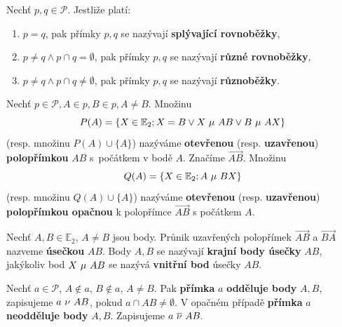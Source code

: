 \begin{definition}
  Nechť $p,q\in \mathscr P$. Jestliže platí:
  \begin{enumerate}[$i.$]
    \item $p=q$, pak přímky $p,q$ se nazývají \textbf{splývající rovnoběžky},
    \item $p \ne q \land p\cap q = \emptyset$, pak přímky $p,q$ se nazývají \textbf{různé rovnoběžky},
    \item $p \ne q \land p\cap q \ne \emptyset$, pak přímky $p,q$ se nazývají \textbf{různoběžky}.
  \end{enumerate}
\end{definition}

\begin{definition}
  Nechť $p\in \mathscr P,A \in p, B \in p, A \ne B.$ Množinu
  \[
    P(A)=\left \{ X\in \mathbb E_2; X=B \lor X \operatorname{\,\mu\,} AB \lor B \operatorname{\,\mu\,} AX \right \}
  \]
  (resp. množinu $P(A) \cup \{A\}$) nazýváme \textbf{otevřenou} (resp. \textbf{uzavřenou}) \textbf{polopřímkou} $AB$ s~počátkem v bodě $A$. Značíme $\overrightarrow{AB}$. Množinu
  \[
    Q(A)=\left \{ X\in \mathbb E_2; A \operatorname{\,\mu\,} BX \right \}
  \]
  (resp. množinu $Q(A) \cup \{A\}$) nazýváme \textbf{otevřenou} (resp. \textbf{uzavřenou}) \textbf{polopřímkou opačnou} k polopřímce $\overrightarrow{AB}$ s počátkem $A$.
\end{definition}

\begin{definition}
  Nechť $A,B\in \mathbb E_2$, $A\ne B$ jsou body. Průnik uzavřených polopřímek $\overrightarrow{AB}$ a $\overrightarrow{BA}$ nazveme \textbf{úsečkou} $AB$.
  Body $A,B$ se nazývají \textbf{krajní body úsečky} $AB$, jakýkoliv bod $X \operatorname{\,\mu\,} AB$ se nazývá \textbf{vnitřní bod} úsečky $AB$.
\end{definition}

\begin{definition}
Nechť $a\in \mathscr P$, $A\notin a$, $B\notin a$, $A\ne B$. Pak \textbf{přímka} $a$ \textbf{odděluje body} $A,B$, zapisujeme $a \operatorname{\,\nu\,} AB$, pokud $a \cap AB \neq \emptyset$. V opačném případě \textbf{přímka} $a$ \textbf{neodděluje body} $A,B$. Zapisujeme $a \operatorname{\,\overline{\nu}\,} AB.$
\end{definition}

